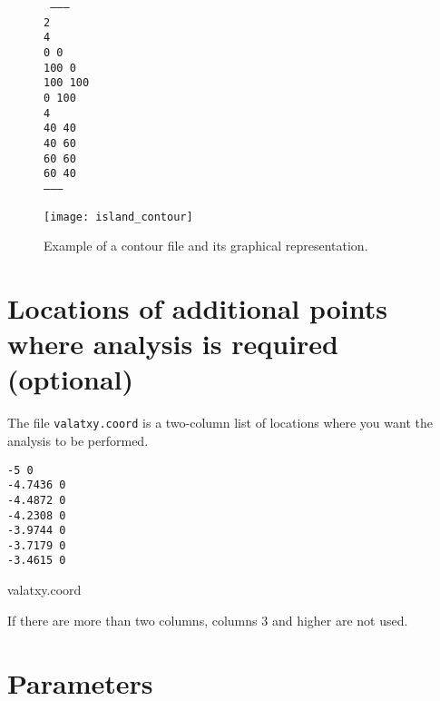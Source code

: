 \begin{figure}[H]
\centering 
\parbox{.5\textwidth}{

\begin{footnotesize}
\tt
--------\\
2\\
4\\
0 0\\
100 0\\
100 100\\
0 100\\
4\\
40 40\\
40 60\\
60 60\\
60 40\\
--------
\end{footnotesize}

}\parbox{.5\textwidth}{
\texttt{[image: island\_contour]}
}

\caption{Example of a contour file and its graphical representation.}
\end{figure}



\section[Additional points of analysis]{Locations of additional points where analysis is required (optional)}

The file \texttt{valatxy.coord} is a two-column list of locations where you want the analysis to be performed.  

\begin{exfile}[htpb]
\begin{footnotesize}
\texttt{-5 0\\
-4.7436 0\\
-4.4872 0\\
-4.2308 0\\
-3.9744 0\\
-3.7179 0\\
-3.4615 0} 
\end{footnotesize}
\caption{valatxy.coord\label{ex:valatxy}}
\end{exfile}

If there are more than two columns, columns 3 and higher are not used.

\section{Parameters\label{sec:param.par}}

